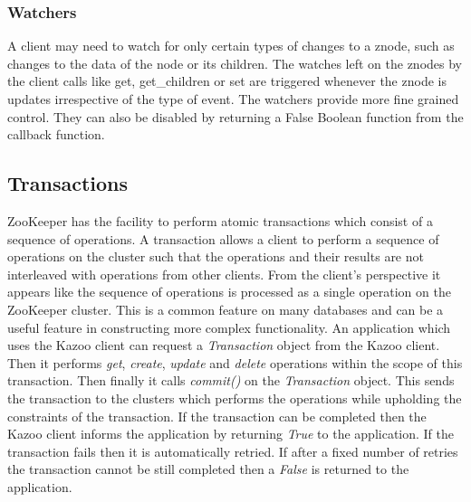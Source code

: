   \subsubsection{Watchers}
  A client may need to watch for only certain types of changes to a znode, such as changes to the data of the node or its children. The watches left on the znodes by the client calls like get, get\_children or set are triggered whenever the znode is updates irrespective of the type of event. The watchers provide more fine grained control. They can also be disabled by returning a False Boolean function from the callback function.
  
  \subsection{Transactions}
  ZooKeeper has the facility to perform atomic transactions which consist of a sequence of operations. A transaction allows a client to perform a sequence of operations on the cluster such that the operations and their results are not interleaved with operations from other clients. From the client's perspective it appears like the sequence of operations is processed as a single operation on the ZooKeeper cluster. This is a common feature on many databases and can be a useful feature in constructing more complex functionality. An application which uses the Kazoo client can request a \textit{Transaction} object from the Kazoo client. Then it performs \textit{get}, \textit{create}, \textit{update} and \textit{delete} operations within the scope of this transaction. Then finally it calls \textit{commit()} on the \textit{Transaction} object. This sends the transaction to the clusters which performs the operations while upholding the constraints of the transaction. If the transaction can be completed then the Kazoo client informs the application by returning \textit{True} to the application. If the transaction fails then it is automatically retried. If after a fixed number of retries the transaction cannot be still completed then a \textit{False} is returned to the application.